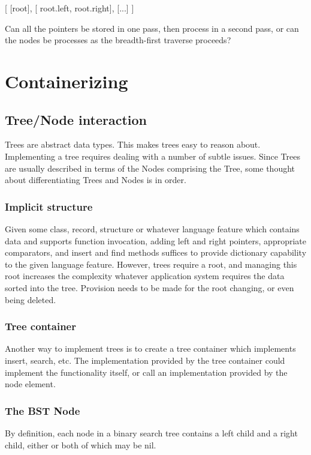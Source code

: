 \documentclass{article}
\begin{document}
[
 [root],
 [ root.left, root.right],
 [...]
]

Can all the pointers be stored in one pass, then process in a second pass,
or can the nodes be processes as the breadth-first traverse proceeds?


\section{Containerizing}

\subsection{Tree/Node interaction}

Trees are abstract data types. This makes trees easy to reason about.
Implementing a tree requires dealing with a number of subtle issues.
Since Trees are usually described in terms of the Nodes comprising
the Tree, some thought about differentiating Trees and Nodes is in order.

\subsubsection{Implicit structure}

Given some class, record, structure or whatever language feature which contains
data and supports function invocation, adding left and right pointers,
appropriate comparators, and insert and find methods suffices to provide
dictionary capability to the given language feature. However, trees require a
root, and managing this root increases the complexity whatever application
system requires the data sorted into the tree. Provision needs to be made for
the root changing, or even being deleted.

\subsubsection{Tree container}

Another way to implement trees is to create a tree container which implements
insert, search, etc. The implementation provided by the tree container could
implement the functionality itself, or call an implementation provided by
the node element.

\subsubsection{The BST Node}

By definition, each node in a binary search tree contains a left child and
a right child, either or both of which may be nil.
\end{document}
